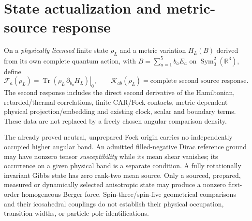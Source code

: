 \documentclass[12pt,a4paper]{article}
\begin{document}
\section{State actualization and metric-source response}
\label{bh:berger:v117:p4b:state-shear}
\begin{definition}
\label{bh:berger:v117:p4b:packet}
On a \emph{physically licensed} finite state $\rho_L$ and a metric
variation $H_L(B)$ derived from its own complete quantum action,
with $B=\sum_{a=1}^5b_aE_a$ on
$\operatorname{Sym}^2_0(\mathbb R^3)$, define
\[
 \mathcal F_a(\rho_L)=
 \left.\operatorname{Tr}(\rho_L\,\partial_{b_a}H_L)\right|_0,
 \qquad
 \mathcal K_{ab}(\rho_L)=\text{complete second source response}.
\]
The second response includes the direct second derivative of the
Hamiltonian, retarded/thermal correlations, finite CAR/Fock contacts,
metric-dependent physical projection/embedding and existing
clock, scalar and boundary terms. These data are not replaced by a
freely chosen angular comparison density.
\end{definition}
\begin{remark}
\label{bh:berger:v117:p4b:occupation-gates}
The already proved neutral, unprepared Fock origin carries no
independently occupied higher angular band. An admitted filled-negative
Dirac reference ground may have nonzero tensor \emph{susceptibility}
while its mean shear vanishes; its occurrence on a given physical
band is a separate condition. A fully rotationally invariant Gibbs
state has zero rank-two mean source. Only a sourced, prepared,
measured or dynamically selected anisotropic state may produce a
nonzero first-order homogeneous Berger force.
Spin-three/spin-five geometrical comparisons and their icosahedral
couplings do not establish their physical occupation, transition
widths, or particle pole identifications.
\end{remark}
\end{document}
